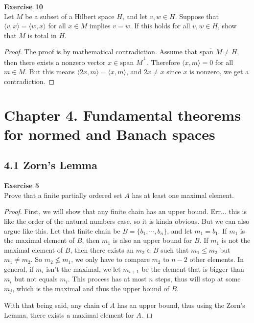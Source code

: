 \documentclass[12pt, a4paper]{article}
\theoremstyle{plain}
\newenvironment{exercise}[2][Exercise]
    { \begin{mdframed}[backgroundcolor=gray!20] \textbf{#1 #2} \\}
    {  \end{mdframed}}
\begin{document}
\begin{exercise}{10}
Let $M$ be a subset of a Hilbert space $H$, and let $v,w\in H$. Suppose that $\langle{v,x}\rangle = \langle{w,x}\rangle$ for all $x\in M$ implies $v=w$. If this holds for all $v,w\in H$, show that $M$ is total in $H$.
\end{exercise}
	\begin{proof}
	The proof is by mathematical contradiction. Assume that $\overline{\text{span }M} \neq H$, then there exists a nonzero vector $x\in \overline{\text{span }M}^\perp$. Therefore $\langle{x,m}\rangle = 0$ for all $m\in M$. But this means $\langle{2x,m}\rangle = \langle{x,m}\rangle$, and $2x\neq x$ since $x$ is nonzero, we get a contradiction.
	\end{proof}
\pagebreak
\section*{Chapter 4. Fundamental theorems for normed and Banach spaces}

\subsection*{4.1 Zorn's Lemma}

\begin{exercise}{5}
Prove that a finite partially ordered set $A$ has at least one maximal element.
\end{exercise}
	\begin{proof}
	First, we will show that any finite chain has an upper bound. Err... this is like the order of the natural numbers case, so it is kinda obvious. But we can also argue like this. Let that finite chain be $B=\{b_1,\cdots,b_n\}$, and let $m_1 = b_1$. If $m_1$ is the maximal element of $B$, then $m_1$ is also an upper bound for $B$. If $m_1$ is not the maximal element of $B$, then there exists an $m_2\in B$ such that $m_1\leq m_2$ but $m_1 \neq m_2$. So $m_2 \not\leq m_1$, we only have to compare $m_2$ to $n-2$ other elements. In general, if $m_i$ isn't the maximal, we let $m_{i+1}$ be the element that is bigger than $m_{i}$ but not equals $m_i$. This process has at most $n$ steps, thus will stop at some $m_j$, which is the maximal and thus the upper bound of $B$.
	
	With that being said, any chain of $A$ has an upper bound, thus using the Zorn's Lemma, there exists a maximal element for $A$.
	\end{proof}
\end{document}
